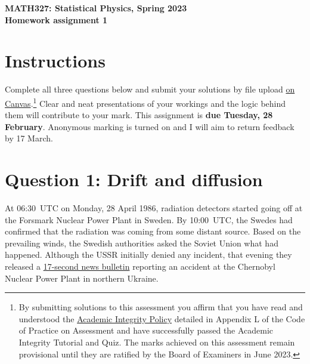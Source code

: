 \documentclass[12 pt]{article} %
\begin{document}
\newcommand{\thisweek}{MATH327 Homework 1}
\newcommand{\moddate}{Last modified 17 Feb.~2023}
\begin{center}
  {\Large \textbf{MATH327: Statistical Physics, Spring 2023}} \\[12 pt]
  {\Large \textbf{Homework assignment 1}} \\[24 pt]
\end{center}

\section*{Instructions}
Complete all three questions below and submit your solutions by file upload \href{https://canvas.liverpool.ac.uk/courses/60601/assignments/226600}{on Canvas}.\footnote{By submitting solutions to this assessment you affirm that you have read and understood the \href{https://www.liverpool.ac.uk/media/livacuk/tqsd/code-of-practice-on-assessment/appendix_L_cop_assess.pdf}{Academic Integrity Policy} detailed in Appendix L of the Code of Practice on Assessment and have successfully passed the Academic Integrity Tutorial and Quiz.  The marks achieved on this assessment remain provisional until they are ratified by the Board of Examiners in June 2023.}
Clear and neat presentations of your workings and the logic behind them will contribute to your mark.
This assignment is \textbf{due Tuesday, 28 February}.
Anonymous marking is turned on and I will aim to return feedback by 17 March. %



\vfill
\section*{Question 1: Drift and diffusion}
At 06:30~UTC on Monday, 28 April 1986, radiation detectors started going off at the Forsmark Nuclear Power Plant in Sweden.
By 10:00~UTC, the Swedes had confirmed that the radiation was coming from some distant source.
Based on the prevailing winds, the Swedish authorities asked the Soviet Union what had happened.
Although the USSR initially denied any incident, that evening they released a \href{https://www.youtube.com/watch?v=sC7n_QgJRks}{17-second news bulletin} reporting an accident at the Chernobyl Nuclear Power Plant in northern Ukraine.
\end{document}
